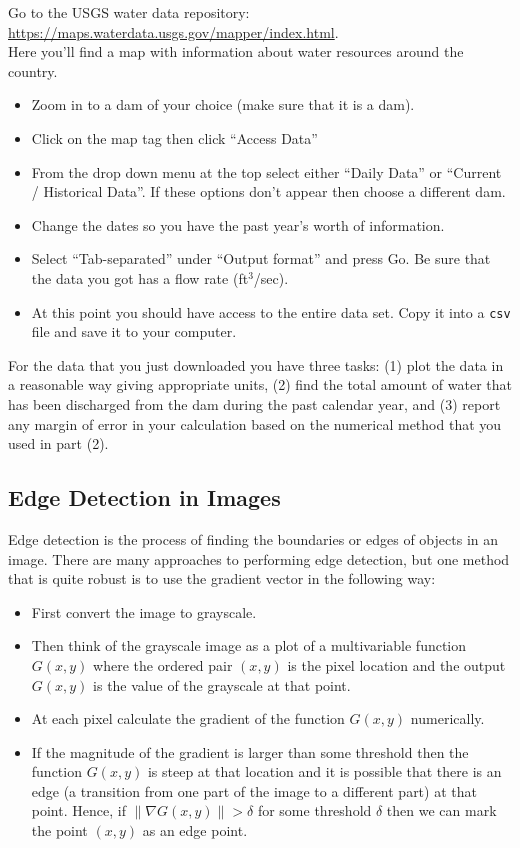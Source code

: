 \documentclass[
]{book}
\providecommand{\tightlist}{%
  \setlength{\itemsep}{0pt}\setlength{\parskip}{0pt}}
\theoremstyle{definition}
\theoremstyle{definition}
\theoremstyle{definition}
\theoremstyle{remark}
\begin{document}
Go to the USGS water data repository:\\
\url{https://maps.waterdata.usgs.gov/mapper/index.html}.\\
Here you'll find a map with information about water resources around the
country.

\begin{itemize}
\item
  Zoom in to a dam of your choice (make sure that it is a dam).
\item
  Click on the map tag then click ``Access Data''
\item
  From the drop down menu at the top select either ``Daily Data'' or
  ``Current / Historical Data''. If these options don't appear then
  choose a different dam.
\item
  Change the dates so you have the past year's worth of information.
\item
  Select ``Tab-separated'' under ``Output format'' and press Go. Be sure
  that the data you got has a flow rate (ft\(^3\)/sec).
\item
  At this point you should have access to the entire data set. Copy it
  into a \texttt{csv} file and save it to your computer.
\end{itemize}

For the data that you just downloaded you have three tasks: (1) plot the
data in a reasonable way giving appropriate units, (2) find the total
amount of water that has been discharged from the dam during the past
calendar year, and (3) report any margin of error in your calculation
based on the numerical method that you used in part (2).

\hypertarget{edge-detection-in-images}{%
\subsection{Edge Detection in Images}\label{edge-detection-in-images}}

Edge detection is the process of finding the boundaries or edges of objects in an image. There are many approaches to performing edge detection, but one method that is quite robust is to use the gradient vector in the following way:

\begin{itemize}
\tightlist
\item
  First convert the image to grayscale.
\item
  Then think of the grayscale image as a plot of a multivariable function \(G(x,y)\) where the ordered pair \((x,y)\) is the pixel location and the output \(G(x,y)\) is the value of the grayscale at that point.
\item
  At each pixel calculate the gradient of the function \(G(x,y)\) numerically.
\item
  If the magnitude of the gradient is larger than some threshold then the function \(G(x,y)\) is steep at that location and it is possible that there is an edge (a transition from one part of the image to a different part) at that point. Hence, if \(\|\nabla G(x,y)\| > \delta\) for some threshold \(\delta\) then we can mark the point \((x,y)\) as an edge point.
\end{itemize}
\end{document}
